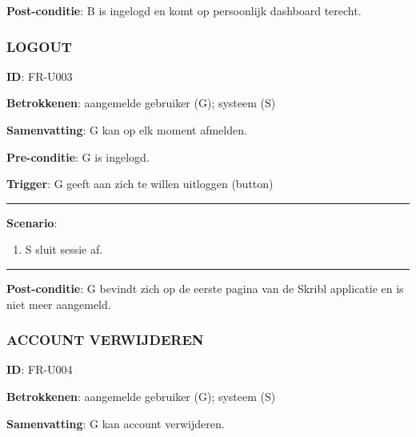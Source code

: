 \noindent \textbf{Post-conditie}: B is ingelogd en komt op persoonlijk dashboard terecht. \\



\subsubsection{LOGOUT}
\vspace{2 mm}

\textbf{ID}: FR-U003
\vspace{2 mm}

\noindent \textbf{Betrokkenen}: aangemelde gebruiker (G); systeem (S) 
\vspace{2 mm}

\noindent \textbf{Samenvatting}: G kan op elk moment afmelden.  
\vspace{2 mm}

\noindent \textbf{Pre-conditie}: G is ingelogd. 
\vspace{2 mm}

\noindent \textbf{Trigger}: G geeft aan zich te willen uitloggen (button)

\vspace{4 mm}
\hrule
\vspace{2 mm}
\noindent \textbf{Scenario}:
\begin{enumerate}
  \item S sluit sessie af. 
\end{enumerate}


\vspace{2 mm}
\hrule
\vspace{4 mm}

\noindent \textbf{Post-conditie}: G bevindt zich op de eerste pagina van de Skribl applicatie en is niet meer aangemeld. \\



\subsubsection{ACCOUNT VERWIJDEREN}
\vspace{2 mm}

\textbf{ID}: FR-U004
\vspace{2 mm}

\noindent \textbf{Betrokkenen}: aangemelde gebruiker (G); systeem (S) 
\vspace{2 mm}

\noindent \textbf{Samenvatting}: G kan account verwijderen.  
\vspace{2 mm}

